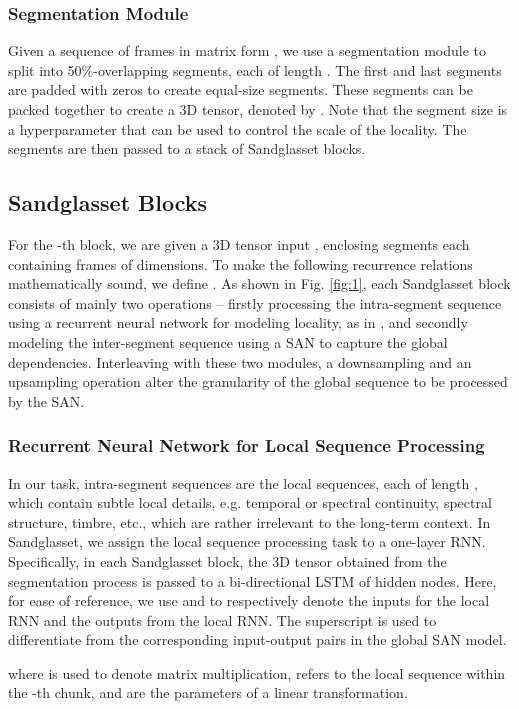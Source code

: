 \documentclass{article}
\begin{document}
\subsubsection{Segmentation Module}
Given a sequence of frames in matrix form , we use a segmentation module to split  into  50\%-overlapping segments, each of length . The first and last segments are padded with zeros to create  equal-size segments. These segments can be packed together to create a 3D tensor, denoted by . Note that the segment size  is a hyperparameter that can be used to control the scale of the locality. The segments  are then passed to a stack of Sandglasset blocks.

\subsection{Sandglasset Blocks}
For the -th block, we are given a 3D tensor input , enclosing  segments each containing  frames of  dimensions. To make the following recurrence relations mathematically sound, we define .
As shown in Fig. \ref{fig:1}, each Sandglasset block consists of mainly two operations -- firstly processing the intra-segment sequence using a recurrent neural network for modeling locality, as in \cite{luo2019dual}, and secondly modeling the inter-segment sequence using a SAN to capture the global dependencies. Interleaving with these two modules, a downsampling and an upsampling operation alter the granularity of the global sequence to be processed by the SAN.

\subsubsection{Recurrent Neural Network for Local Sequence Processing}
In our task, intra-segment sequences are the local sequences, each of length , which contain subtle local details, e.g. temporal or spectral continuity, spectral structure, timbre, etc., which are rather irrelevant to the long-term context.
In Sandglasset, we assign the local sequence processing task to a one-layer RNN. Specifically, in each Sandglasset block, the 3D tensor  obtained from the segmentation process is passed to a bi-directional LSTM of  hidden nodes. Here, for ease of reference, we use  and  to respectively denote the inputs for the local RNN and the outputs from the local RNN. The superscript  is used to differentiate from the corresponding input-output pairs in the global SAN model.

where  is used to denote matrix multiplication,  refers to the local sequence within the -th chunk,  and  are the parameters of a linear transformation.
\end{document}
